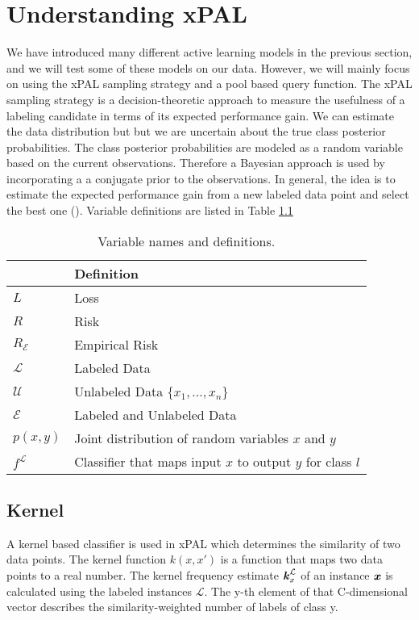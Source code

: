 \chapter{Understanding xPAL}

We have introduced many different active learning models in the previous section, and we will test some of these models on our data. However, we will mainly focus on using the xPAL sampling strategy and a pool based query function. The xPAL sampling strategy is a decision-theoretic approach to measure the usefulness of a labeling candidate in terms of its expected performance gain. We can estimate the data distribution but but we are uncertain about the true class posterior probabilities. The class posterior probabilities are modeled as a random variable based on the current observations. Therefore a Bayesian approach is used by incorporating a a conjugate prior to the observations. In general, the idea is to estimate the expected performance gain from a new labeled data point and select the best one (\cite{kottke2021toward}). Variable definitions are listed in Table \ref{tab:var_defs}

\begin{table}[ht]
\centering
\begin{tabular}{|l|l|}
\hline
{} & \textbf{Definition} \\
\hline
$\textit{L}$ & Loss \\
\hline
$\textit{R}$ & Risk \\
\hline
$\textit{R}_{\mathcal{E}}$ & Empirical Risk \\
\hline
$\mathcal{L}$ & Labeled Data \\
\hline
$\mathcal{U}$ & Unlabeled Data $\{x_1,...,x_n\}$ \\
\hline
$\mathcal{E}$ & Labeled and Unlabeled Data \\
\hline
$p(x,y)$ & Joint distribution of random variables $x$ and $y$ \\
\hline
$f^{\mathcal{L}}$ & Classifier that maps input $x$ to output $y$ for class $l$ \\
\hline
\end{tabular}
\caption{Variable names and definitions.}
\label{tab:var_defs}
\end{table}

\section{Kernel}

A kernel based classifier is used in xPAL which determines the similarity of two data points. The kernel function $k(x,x')$ is a function that maps two data points to a real number. The kernel frequency estimate $\textbf{\textit{k}}^{\mathcal{L}}_x$ of an instance $\textbf{\textit{x}}$ is calculated using the labeled instances $\mathcal{L}$. The y-th element of that C-dimensional vector describes the similarity-weighted number of labels of class y.

